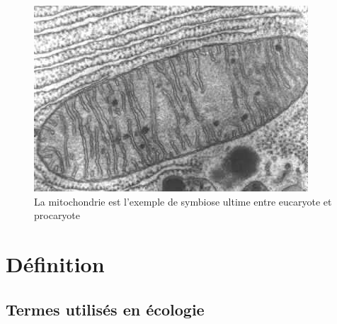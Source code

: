 \documentclass[12pt,a4paper]{article}
\begin{document}
\begin{figure}[ht]
\begin{center}
\includegraphics[scale=0.5]{img/mitochondrie.jpg}\hfill
\end{center}
\caption{La mitochondrie est l'exemple de symbiose ultime entre eucaryote et procaryote}
\label{mitochondrie}
\end{figure}



\newpage

\section{Définition}
\subsection{Termes utilisés en écologie}
\end{document}
